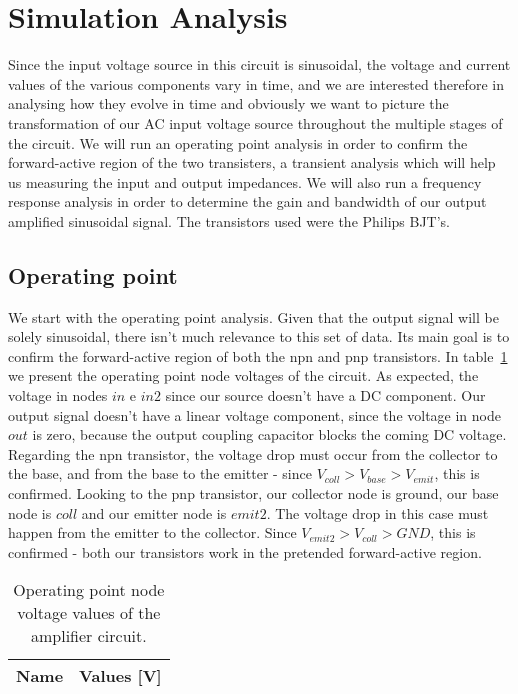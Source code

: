 \newpage
\section{Simulation Analysis}
\label{sec:simulation}
Since the input voltage source in this circuit is sinusoidal, the voltage and current values of the various components vary in time, and we are interested therefore in analysing how they evolve in time and obviously we want to picture the transformation of our AC input voltage source throughout the multiple stages of the circuit. We will run an operating point analysis in order to confirm the forward-active region of the two transisters, a transient analysis which will help us measuring the input and output impedances. We will also run a frequency response analysis in order to determine the gain and bandwidth of our output amplified sinusoidal signal. The transistors used were the Philips BJT's.

\subsection{Operating point}
We start with the operating point analysis. Given that the output signal will be solely sinusoidal, there isn't much relevance to this set of data. Its main goal is to confirm the forward-active region of both the npn and pnp transistors. In table~\ref{tab:operator} we present the operating point node voltages of the circuit. As expected, the voltage in nodes $in$ e $in2$ since our source doesn't have a DC component. Our output signal doesn't have a linear voltage component, since the voltage in node $out$ is zero, because the output coupling capacitor blocks the coming DC voltage. Regarding the npn transistor, the voltage drop must occur from the collector to the base, and from the base to the emitter - since $V_{coll}>V_{base}>V_{emit}$, this is confirmed. Looking to the pnp transistor, our collector node is ground, our base node is $coll$ and our emitter node is $emit2$. The voltage drop in this case must happen from the emitter to the collector. Since $V_{emit2}>V_{coll}>GND$, this is confirmed - both our transistors work in the pretended forward-active region.

\begin{table}[h]
  \centering
  \begin{tabular}{|l|r|}
    \hline    
    {\bf Name} & {\bf Values [V]} \\ \hline
     
  \end{tabular}
  \caption{Operating point node voltage values of the amplifier circuit.}
  \label{tab:operator}
\end{table}


